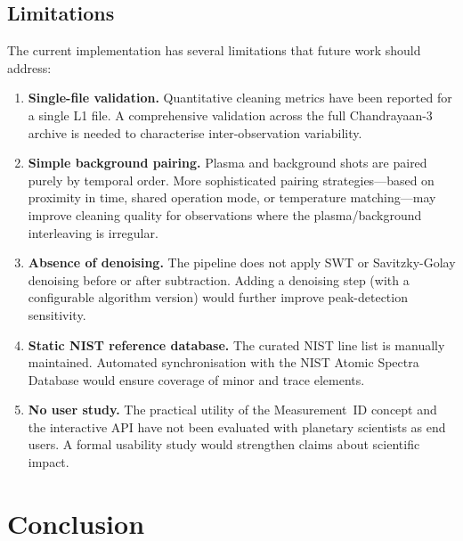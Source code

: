 \documentclass[a4paper,twocolumn,10pt]{article}
\begin{document}
\subsection{Limitations}

The current implementation has several limitations that future work
should address:

\begin{enumerate}[nosep,leftmargin=*]
  \item \textbf{Single-file validation.}  Quantitative cleaning
    metrics have been reported for a single L1 file.  A comprehensive
    validation across the full Chandrayaan-3 archive is needed to
    characterise inter-observation variability.

  \item \textbf{Simple background pairing.}  Plasma and background
    shots are paired purely by temporal order.  More sophisticated
    pairing strategies---based on proximity in time, shared operation
    mode, or temperature matching---may improve cleaning quality
    for observations where the plasma/background interleaving
    is irregular.

  \item \textbf{Absence of denoising.}  The pipeline does not apply
    SWT or Savitzky-Golay denoising before or after subtraction.
    Adding a denoising step (with a configurable algorithm version)
    would further improve peak-detection sensitivity.

  \item \textbf{Static NIST reference database.}  The curated NIST
    line list is manually maintained.  Automated synchronisation with
    the NIST Atomic Spectra Database would ensure coverage of minor
    and trace elements.

  \item \textbf{No user study.}  The practical utility of the
    Measurement~ID concept and the interactive API have not been
    evaluated with planetary scientists as end users.  A formal
    usability study would strengthen claims about scientific impact.
\end{enumerate}


\section{Conclusion}
\label{sec:conclusion}
\end{document}
